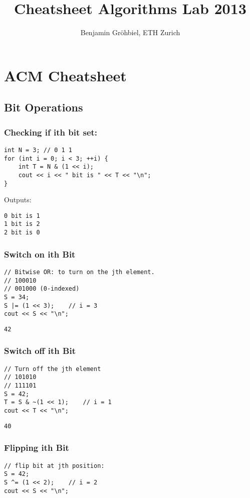 \documentclass[11pt]{article}
\title{Cheatsheet Algorithms Lab 2013}
\author{Benjamin Gröhbiel, ETH Zurich}
\let\stdsection\section
\renewcommand\section{\newpage\stdsection}
\begin{document}
\maketitle

\section{ACM Cheatsheet}
 
\subsection{Bit Operations}
\subsubsection{Checking if ith bit set:}
\begin{lstlisting}
int N = 3; // 0 1 1
for (int i = 0; i < 3; ++i) {
    int T = N & (1 << i);
	cout << i << " bit is " << T << "\n";
}
\end{lstlisting}

Outputs: 
\begin{lstlisting}
0 bit is 1
1 bit is 2
2 bit is 0
\end{lstlisting}

\subsubsection{Switch on ith Bit}
\begin{lstlisting}
// Bitwise OR: to turn on the jth element.
// 100010
// 001000 (0-indexed)
S = 34;
S |= (1 << 3);    // i = 3
cout << S << "\n";
\end{lstlisting}

\begin{lstlisting}
42
\end{lstlisting}

\subsubsection{Switch off ith Bit}
\begin{lstlisting}
// Turn off the jth element
// 101010
// 111101
S = 42;
T = S & ~(1 << 1);    // i = 1
cout << T << "\n";
\end{lstlisting}

\begin{lstlisting}
40
\end{lstlisting}

\subsubsection{Flipping ith Bit}
\begin{lstlisting}
// flip bit at jth position: 
S = 42;
S ^= (1 << 2);    // i = 2
cout << S << "\n";
\end{lstlisting}
\end{document}
